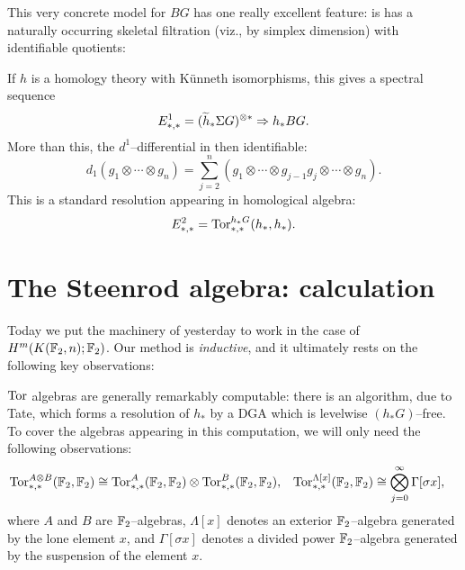 This very concrete model for $BG$ has one really excellent feature: is has a naturally occurring skeletal filtration (viz., by simplex dimension) with identifiable quotients:

\begin{figure*}
\begin{center}
\end{center}
\end{figure*}

If $h$ is a homology theory with K\"unneth isomorphisms, this gives a spectral sequence \[E^1_{*, *} = (\widetilde h_* \Sigma G)^{\otimes *} \Rightarrow h_* BG.\]  More than this, the $d^1$--differential in then identifiable: \[d_1(g_1 \otimes \cdots \otimes g_n) = \sum_{j=2}^n (g_1 \otimes \cdots \otimes g_{j-1} g_j \otimes \cdots \otimes g_n).\]  This is a standard resolution appearing in homological algebra:
\[E_{*, *}^2 = \operatorname{Tor}^{h_* G}_{*, *}(h_*, h_*).\]




\section{The Steenrod algebra: calculation}\label{StableSteenrodAlgCalculation}

Today we put the machinery of yesterday to work in the case of $H^m(K(\mathbb F_2, n); \mathbb F_2)$.
Our method is \emph{inductive}, and it ultimately rests on the following key observations:

\begin{example}
$\operatorname{Tor}$ algebras are generally remarkably computable: there is an algorithm, due to Tate, which forms a resolution of $h_*$ by a DGA which is levelwise $(h_* G)$--free.
To cover the algebras appearing in this computation, we will only need the following observations:
\begin{align*}
\operatorname{Tor}^{A \otimes B}_{*, *}(\mathbb F_2, \mathbb F_2) & \cong \operatorname{Tor}^A_{*, *}(\mathbb F_2, \mathbb F_2) \otimes \operatorname{Tor}^B_{*, *}(\mathbb F_2, \mathbb F_2), &
\operatorname{Tor}^{\Lambda[x]}_{*, *}(\mathbb F_2, \mathbb F_2) & \cong \bigotimes_{j=0}^\infty \Gamma[\sigma x],
\end{align*}
where $A$ and $B$ are $\mathbb F_2$--algebras, $\Lambda[x]$ denotes an exterior $\mathbb F_2$--algebra generated by the lone element $x$, and $\Gamma[\sigma x]$ denotes a divided power $\mathbb F_2$--algebra generated by the suspension of the element $x$.
\end{example}

